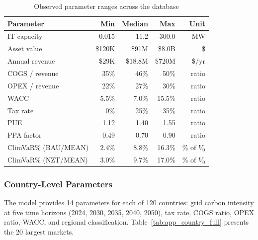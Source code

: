 \begin{table}[H]
\centering
\small
\caption{Observed parameter ranges across the database}
\label{tab:app_ranges}
\begin{tabular}{@{}lrrrr@{}}
\toprule
\textbf{Parameter} & \textbf{Min} & \textbf{Median} & \textbf{Max} & \textbf{Unit} \\
\midrule
IT capacity & 0.015 & 11.2 & 300.0 & MW \\
Asset value & \$120K & \$91M & \$8.0B & \$ \\
Annual revenue & \$29K & \$18.8M & \$720M & \$/yr \\
COGS / revenue & 35\% & 46\% & 50\% & ratio \\
OPEX / revenue & 22\% & 27\% & 30\% & ratio \\
WACC & 5.5\% & 7.0\% & 15.5\% & ratio \\
Tax rate & 0\% & 25\% & 35\% & ratio \\
PUE & 1.12 & 1.40 & 1.55 & ratio \\
PPA factor & 0.49 & 0.70 & 0.90 & ratio \\
ClimVaR\% (BAU/MEAN) & 2.4\% & 8.8\% & 16.3\% & \% of $V_0$ \\
ClimVaR\% (NZT/MEAN) & 3.0\% & 9.7\% & 17.0\% & \% of $V_0$ \\
\bottomrule
\end{tabular}
\end{table}


\subsubsection{Country-Level Parameters}

The model provides 14 parameters for each of 120 countries: grid carbon intensity at five
time horizons (2024, 2030, 2035, 2040, 2050), tax rate, COGS ratio, OPEX ratio, WACC, and
regional classification. Table~\ref{tab:app_country_full} presents the 20 largest markets.

